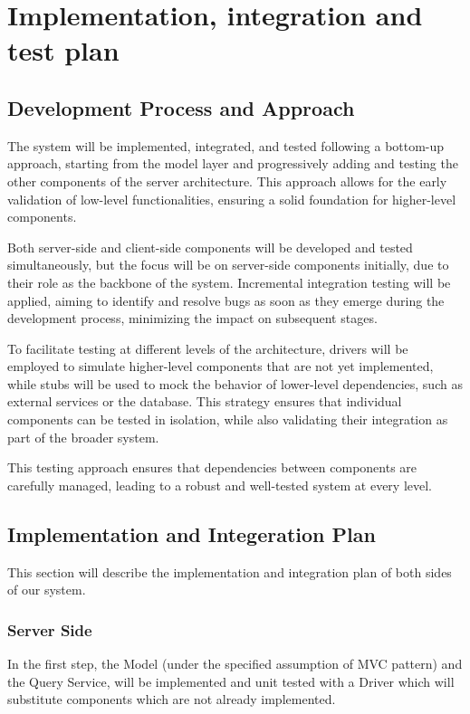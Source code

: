 \chapter{Implementation, integration and test plan}


\section{Development Process and Approach}

The system will be implemented, integrated, and tested following a bottom-up approach, 
starting from the model layer and progressively adding and testing the other components of the server architecture. 
This approach allows for the early validation of low-level functionalities, ensuring a solid foundation 
for higher-level components.

Both server-side and client-side components will be developed and tested simultaneously, 
but the focus will be on server-side components initially, due to their role as the backbone of the system. 
Incremental integration testing will be applied, aiming to identify and resolve bugs as soon as they emerge during 
the development process, minimizing the impact on subsequent stages.

To facilitate testing at different levels of the architecture, drivers will be employed to simulate higher-level 
components that are not yet implemented, while stubs will be used to mock the behavior of lower-level dependencies, 
such as external services or the database. This strategy ensures that individual components can be tested in isolation, 
while also validating their integration as part of the broader system.

This testing approach ensures that dependencies between components are carefully managed, 
leading to a robust and well-tested system at every level.


\section{Implementation and Integeration Plan}
This section will describe the implementation and integration plan of both sides of our system.



\subsection{Server Side}

In the first step, the Model (under the specified assumption of MVC pattern) and the
Query Service, will be implemented and unit tested with a Driver which will substitute
components which are not already implemented.

